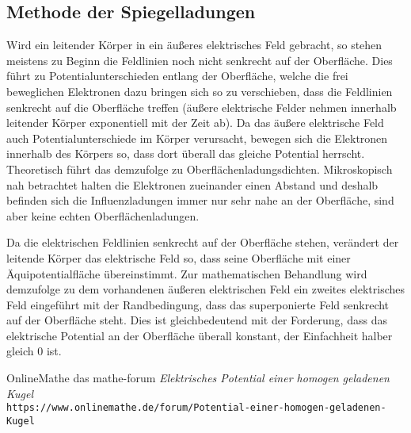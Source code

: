 \documentclass[titlepage,11pt,a4paper,ngerman]{report}
\begin{document}
\renewcommand\appendixpagename{Anhang}
\begin{appendices}
\section{Methode der Spiegelladungen}\label{imagechargestheory}
Wird ein leitender Körper in ein äußeres elektrisches Feld gebracht, so stehen meistens zu Beginn die Feldlinien noch nicht senkrecht auf der Oberfläche. Dies führt zu Potentialunterschieden entlang der Oberfläche, welche die frei beweglichen Elektronen dazu bringen sich so zu verschieben, dass die Feldlinien senkrecht auf die Oberfläche treffen (äußere elektrische Felder nehmen innerhalb leitender Körper exponentiell mit der Zeit ab). Da das äußere elektrische Feld auch Potentialunterschiede im Körper verursacht, bewegen sich die Elektronen innerhalb des Körpers so, dass dort überall das gleiche Potential herrscht. Theoretisch führt das demzufolge zu Oberflächenladungsdichten. Mikroskopisch nah betrachtet halten die Elektronen zueinander einen Abstand und deshalb befinden sich die Influenzladungen immer nur sehr nahe an der Oberfläche, sind aber keine echten Oberflächenladungen.
\par
Da die elektrischen Feldlinien senkrecht auf der Oberfläche stehen, verändert der leitende Körper das elektrische Feld so, dass seine Oberfläche mit einer Äquipotentialfläche übereinstimmt. Zur mathematischen Behandlung wird demzufolge zu dem vorhandenen äußeren elektrischen Feld ein zweites elektrisches Feld eingeführt mit der Randbedingung, dass das superponierte Feld senkrecht auf der Oberfläche steht. Dies ist gleichbedeutend mit der Forderung, dass das elektrische Potential an der Oberfläche überall konstant, der Einfachheit halber gleich 0 ist.
\end{appendices}

\begin{thebibliography}{9}
OnlineMathe das mathe-forum
\textit{Elektrisches Potential einer homogen geladenen Kugel}
\\\texttt{https://www.onlinemathe.de/forum/Potential-einer-homogen-geladenen-Kugel}
\end{thebibliography}
\end{document}
